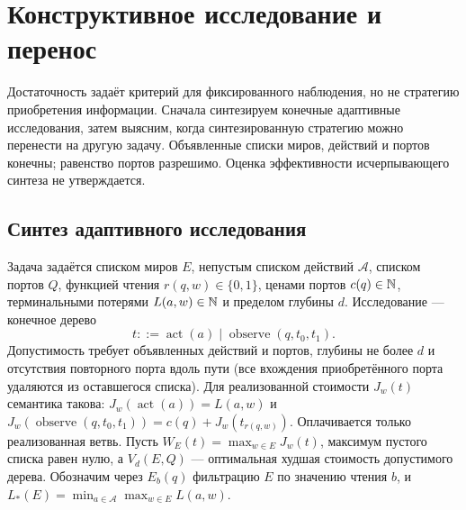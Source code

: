 \section{Конструктивное исследование и перенос}\label{sec:investigation}
Достаточность задаёт критерий для фиксированного наблюдения, но не стратегию приобретения информации. Сначала синтезируем конечные адаптивные исследования, затем выясним, когда синтезированную стратегию можно перенести на другую задачу. Объявленные списки миров, действий и портов конечны; равенство портов разрешимо. Оценка эффективности исчерпывающего синтеза не утверждается.

\subsection{Синтез адаптивного исследования}
Задача задаётся списком миров $E$, непустым списком действий $\mathcal A$, списком портов $Q$, функцией чтения $r(q,w)\in\{0,1\}$, ценами портов $c(q)\in\mathbb N$, терминальными потерями $L(a,w)\in\mathbb N$ и пределом глубины $d$. Исследование --- конечное дерево
\[
 t ::= \operatorname{act}(a)\mid\operatorname{observe}(q,t_0,t_1).
\]
Допустимость требует объявленных действий и портов, глубины не более $d$ и отсутствия повторного порта вдоль пути (все вхождения приобретённого порта удаляются из оставшегося списка). Для реализованной стоимости $J_w(t)$ семантика такова: $J_w(\operatorname{act}(a))=L(a,w)$ и $J_w(\operatorname{observe}(q,t_0,t_1))=c(q)+J_w(t_{r(q,w)})$. Оплачивается только реализованная ветвь. Пусть $W_E(t)=\max_{w\in E}J_w(t)$, максимум пустого списка равен нулю, а $V_d(E,Q)$ --- оптимальная худшая стоимость допустимого дерева. Обозначим через $E_b(q)$ фильтрацию $E$ по значению чтения $b$, и $L_*(E)=\min_{a\in\mathcal A}\max_{w\in E}L(a,w)$.

